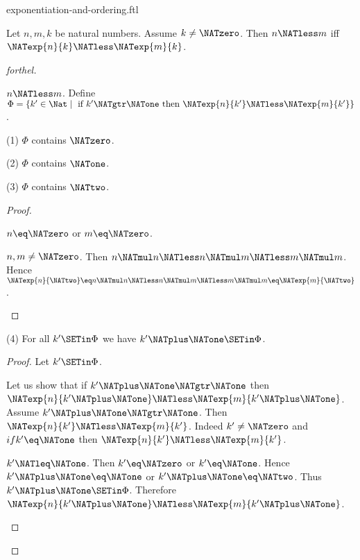 \documentclass{stex}
\begin{document}
\begin{smodule}{exponentiation-and-ordering.ftl}

\begin{proposition}[forthel,id=ARITHMETIC_09_3373702288769024]
  Let $n, m, k$ be natural numbers.
  Assume $k \neq \NATzero$.
  Then $n \NATless m$ iff $\NATexp{n}{k} \NATless \NATexp{m}{k}$.
\end{proposition}
\begin{proof}[forthel]
  \begin{case}{$n \NATless m$.}
    Define $\Phi = \{ k' \in \Nat \mid\text{ if }k' \NATgtr \NATone\text{ then }\NATexp{n}{k'} \NATless \NATexp{m}{k'} \}$.

    (1) $\Phi$ contains $\NATzero$.

    (2) $\Phi$ contains $\NATone$.

    (3) $\Phi$ contains $\NATtwo$.
    \begin{proof}
      \begin{case}{$n \eq \NATzero$ or $m \eq \NATzero$.} \end{case}

      \begin{case}{$n, m \neq \NATzero$.}
        Then $n \NATmul n
          \NATless n \NATmul m
          \NATless m \NATmul m$.
        Hence $\NATexp{n}{\NATtwo}
          \eq n \NATmul n
          \NATless n \NATmul m
          \NATless m \NATmul m
          \eq \NATexp{m}{\NATtwo}$.
      \end{case}
    \end{proof}

    (4) For all $k' \SETin \Phi$ we have $k' \NATplus \NATone \SETin \Phi$.
    \begin{proof}
      Let $k' \SETin \Phi$.

      Let us show that if $k' \NATplus \NATone \NATgtr \NATone$ then $\NATexp{n}{k' \NATplus \NATone} \NATless \NATexp{m}{k' \NATplus \NATone}$.
        Assume $k' \NATplus \NATone \NATgtr \NATone$.
        Then $\NATexp{n}{k'} \NATless \NATexp{m}{k'}$.
        Indeed $k' \neq \NATzero$ and $if k' \eq \NATone$ then $\NATexp{n}{k'} \NATless \NATexp{m}{k'}$.

        \begin{case}{$k' \NATleq \NATone$.}
          Then $k' \eq \NATzero$ or $k' \eq \NATone$.
          Hence $k' \NATplus \NATone \eq \NATone$ or $k' \NATplus \NATone \eq \NATtwo$.
          Thus $k' \NATplus \NATone \SETin \Phi$.
          Therefore $\NATexp{n}{k' \NATplus \NATone} \NATless \NATexp{m}{k' \NATplus \NATone}$.
        \end{case}


\end{proof}
\end{case}
\end{proof}
\end{smodule}
\end{document}
